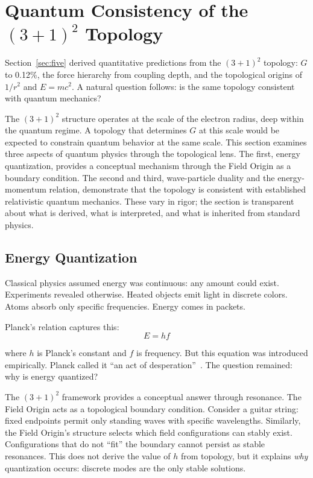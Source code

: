 \documentclass[aps,prd,preprint,superscriptaddress,showpacs,preprintnumbers,amsmath,amssymb,nofootinbib]{revtex4-2}
\begin{document}
\section{Quantum Consistency of the $(3+1)^2$ Topology}
\label{sec:four-more}

Section~\ref{sec:five} derived quantitative predictions from the $(3+1)^2$ topology: $G$ to 0.12\%, the force hierarchy from coupling depth, and the topological origins of $1/r^2$ and $E = mc^2$. A natural question follows: is the same topology consistent with quantum mechanics?

The $(3+1)^2$ structure operates at the scale of the electron radius, deep within the quantum regime. A topology that determines $G$ at this scale would be expected to constrain quantum behavior at the same scale. This section examines three aspects of quantum physics through the topological lens. The first, energy quantization, provides a conceptual mechanism through the Field Origin as a boundary condition. The second and third, wave-particle duality and the energy-momentum relation, demonstrate that the topology is consistent with established relativistic quantum mechanics. These vary in rigor; the section is transparent about what is derived, what is interpreted, and what is inherited from standard physics.

\subsection{Energy Quantization}
\label{subsec:quantization}

Classical physics assumed energy was continuous: any amount could exist. Experiments revealed otherwise. Heated objects emit light in discrete colors. Atoms absorb only specific frequencies. Energy comes in packets.

Planck's relation captures this:
\begin{equation}
E = hf
\end{equation}

where $h$ is Planck's constant and $f$ is frequency. But this equation was introduced empirically. Planck called it ``an act of desperation''~\cite{planck1931}. The question remained: why is energy quantized?

The $(3+1)^2$ framework provides a conceptual answer through resonance. The Field Origin acts as a topological boundary condition. Consider a guitar string: fixed endpoints permit only standing waves with specific wavelengths. Similarly, the Field Origin's structure selects which field configurations can stably exist. Configurations that do not ``fit'' the boundary cannot persist as stable resonances. This does not derive the value of $h$ from topology, but it explains \emph{why} quantization occurs: discrete modes are the only stable solutions.
\end{document}
